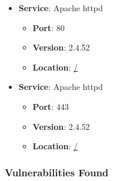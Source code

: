 \documentclass{article}
\begin{document}
\begin{itemize}
    
        \item \textbf{Service}: Apache httpd
        \begin{itemize}
            \item \textbf{Port}: 80
            \item \textbf{Version}:  2.4.52 
            \item \textbf{Location}: \href{ / }{ / }
        \end{itemize}
    
        \item \textbf{Service}: Apache httpd
        \begin{itemize}
            \item \textbf{Port}: 443
            \item \textbf{Version}:  2.4.52 
            \item \textbf{Location}: \href{ / }{ / }
        \end{itemize}
    
\end{itemize}


\subsubsection*{Vulnerabilities Found}
\end{document}

